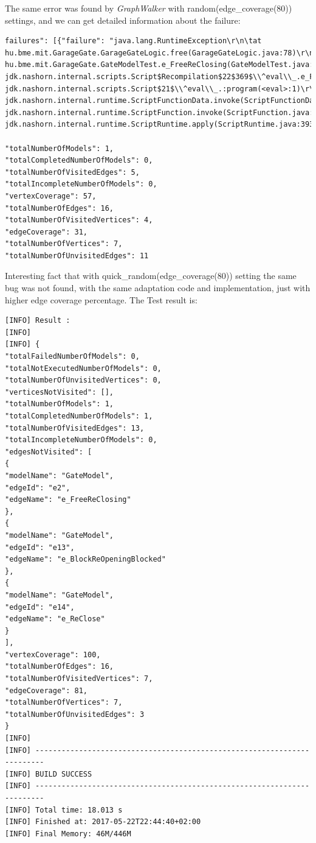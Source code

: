 The same error was found by \textit{GraphWalker} with random(edge\_coverage(80)) settings, and we can get detailed information about the failure:
\begin{lstlisting}
failures": [{"failure": "java.lang.RuntimeException\r\n\tat hu.bme.mit.GarageGate.GarageGateLogic.free(GarageGateLogic.java:78)\r\n\tat hu.bme.mit.GarageGate.GateModelTest.e_FreeReClosing(GateModelTest.java:88)\r\n\tat jdk.nashorn.internal.scripts.Script$Recompilation$22$369$\\^eval\\_.e_FreeReClosing(<eval>:1)\r\n\tat jdk.nashorn.internal.scripts.Script$21$\\^eval\\_.:program(<eval>:1)\r\n\tat jdk.nashorn.internal.runtime.ScriptFunctionData.invoke(ScriptFunctionData.java:637)\r\n\tat jdk.nashorn.internal.runtime.ScriptFunction.invoke(ScriptFunction.java:494)\r\n\tat jdk.nashorn.internal.runtime.ScriptRuntime.apply(ScriptRuntime.java:393)

"totalNumberOfModels": 1,
"totalCompletedNumberOfModels": 0,
"totalNumberOfVisitedEdges": 5,
"totalIncompleteNumberOfModels": 0,
"vertexCoverage": 57,
"totalNumberOfEdges": 16,
"totalNumberOfVisitedVertices": 4,
"edgeCoverage": 31,
"totalNumberOfVertices": 7,
"totalNumberOfUnvisitedEdges": 11
\end{lstlisting}

Interesting fact that with quick\_random(edge\_coverage(80)) setting the same bug was not found, with the same adaptation code and implementation, just with higher edge coverage percentage.
The Test result is:
\begin{lstlisting}
[INFO] Result :
[INFO] 
[INFO] {
"totalFailedNumberOfModels": 0,
"totalNotExecutedNumberOfModels": 0,
"totalNumberOfUnvisitedVertices": 0,
"verticesNotVisited": [],
"totalNumberOfModels": 1,
"totalCompletedNumberOfModels": 1,
"totalNumberOfVisitedEdges": 13,
"totalIncompleteNumberOfModels": 0,
"edgesNotVisited": [
{
"modelName": "GateModel",
"edgeId": "e2",
"edgeName": "e_FreeReClosing"
},
{
"modelName": "GateModel",
"edgeId": "e13",
"edgeName": "e_BlockReOpeningBlocked"
},
{
"modelName": "GateModel",
"edgeId": "e14",
"edgeName": "e_ReClose"
}
],
"vertexCoverage": 100,
"totalNumberOfEdges": 16,
"totalNumberOfVisitedVertices": 7,
"edgeCoverage": 81,
"totalNumberOfVertices": 7,
"totalNumberOfUnvisitedEdges": 3
}
[INFO] 
[INFO] ------------------------------------------------------------------------
[INFO] BUILD SUCCESS
[INFO] ------------------------------------------------------------------------
[INFO] Total time: 18.013 s
[INFO] Finished at: 2017-05-22T22:44:40+02:00
[INFO] Final Memory: 46M/446M
\end{lstlisting}


